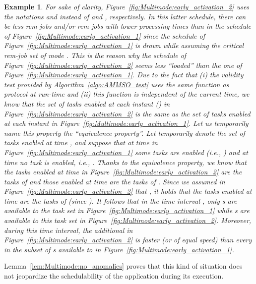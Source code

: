 \documentclass{article}
\newtheorem{validity test}{Validity Test}
\newtheorem{Example}{Example}
\begin{document}
\begin{Example}
For sake of clarity, Figure~\ref{fig:Multimode:early_activation_2} uses the notations  and  instead of  and , respectively. In this latter schedule, there can be less rem-jobs and/or rem-jobs with lower processing times than in the schedule of Figure~\ref{fig:Multimode:early_activation_1} since the schedule of Figure~\ref{fig:Multimode:early_activation_1} is drawn while assuming the critical rem-job set of mode . This is the reason why the schedule of Figure~\ref{fig:Multimode:early_activation_2} seems less ``loaded'' than the one of Figure~\ref{fig:Multimode:early_activation_1}. Due to the fact that (i) the validity test provided by Algorithm~\ref{algo:AMMSO_test} uses the same function  as protocol  at run-time and (ii) this function  is independent of the current time, we know that the set of tasks enabled at each instant  () in Figure~\ref{fig:Multimode:early_activation_2} \emph{is the same as} the set of tasks enabled at each instant  in Figure~\ref{fig:Multimode:early_activation_1}. Let us temporarily name this property the ``equivalence property''. Let  temporarily denote the set of tasks enabled at time ,  and suppose that at time  in Figure~\ref{fig:Multimode:early_activation_1} some tasks are enabled (i.e., ) and at time  no task is enabled, i.e., . Thanks to the equivalence property, we know that the tasks enabled at time  in Figure~\ref{fig:Multimode:early_activation_2} are the tasks of  and those enabled at time  are the tasks of . Since we assumed in Figure~\ref{fig:Multimode:early_activation_2} that , it holds that the tasks enabled at time  are the tasks of  (since ). It follows that in the time interval , only  s are available to the task set  in Figure~\ref{fig:Multimode:early_activation_1} while  s are available to this task set in Figure~\ref{fig:Multimode:early_activation_2}. Moreover, during this time interval, the additional   in Figure~\ref{fig:Multimode:early_activation_2} is faster (or of equal speed) than every  in the subset of s  available to  in Figure~\ref{fig:Multimode:early_activation_1}. 
\end{Example}

Lemma~\ref{lem:Multimode:no_anomalies} proves that this kind of situation does not jeopardize the schedulability of the application during its execution. 
\end{document}
